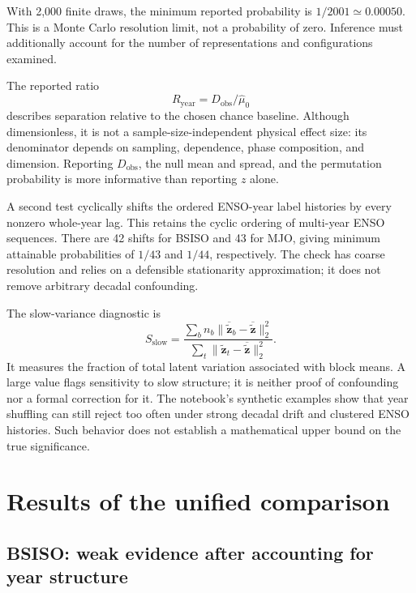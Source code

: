 \documentclass[11pt]{article}
\begin{document}
With 2,000 finite draws, the minimum reported probability is $1/2001\simeq0.00050$. This is a Monte Carlo resolution limit, not a probability of zero. Inference must additionally account for the number of representations and configurations examined.

The reported ratio
\begin{equation}
R_{\mathrm{year}}=D_{\mathrm{obs}}/\widehat\mu_0
\end{equation}
describes separation relative to the chosen chance baseline. Although dimensionless, it is not a sample-size-independent physical effect size: its denominator depends on sampling, dependence, phase composition, and dimension. Reporting $D_{\mathrm{obs}}$, the null mean and spread, and the permutation probability is more informative than reporting $z$ alone.

A second test cyclically shifts the ordered ENSO-year label histories by every nonzero whole-year lag. This retains the cyclic ordering of multi-year ENSO sequences. There are 42 shifts for BSISO and 43 for MJO, giving minimum attainable probabilities of $1/43$ and $1/44$, respectively. The check has coarse resolution and relies on a defensible stationarity approximation; it does not remove arbitrary decadal confounding.

The slow-variance diagnostic is
\begin{equation}
S_{\mathrm{slow}}=
\frac{\sum_b n_b\|\overline{\widetilde{\mathbf z}}_b-
\overline{\widetilde{\mathbf z}}\|_2^2}
{\sum_t\|\widetilde{\mathbf z}_t-
\overline{\widetilde{\mathbf z}}\|_2^2}.
\end{equation}
It measures the fraction of total latent variation associated with block means. A large value flags sensitivity to slow structure; it is neither proof of confounding nor a formal correction for it. The notebook's synthetic examples show that year shuffling can still reject too often under strong decadal drift and clustered ENSO histories. Such behavior does not establish a mathematical upper bound on the true significance.

\section{Results of the unified comparison}
\label{sec:results}

\subsection{BSISO: weak evidence after accounting for year structure}
\end{document}
